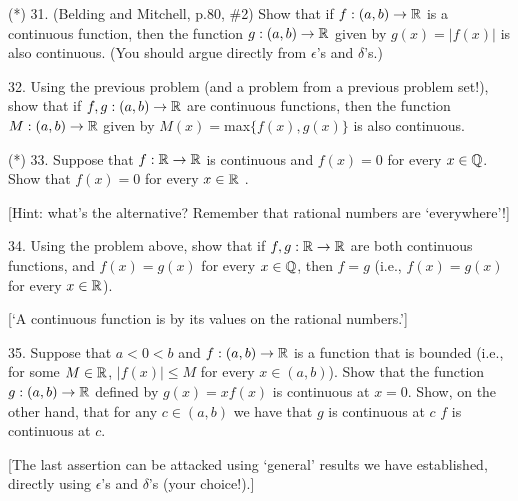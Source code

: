 \documentclass[12pt]{article}
\begin{document}
\begin{description}


\item{(*) 31.} (Belding and Mitchell, p.80, \#2) Show that if $f:(a,b)\rightarrow{\mathbb R}$ is a continuous function, then the function
$g:(a,b)\rightarrow{\mathbb R}$ given by $g(x)=|f(x)|$ is also continuous. (You should argue directly
from $\epsilon$'s and $\delta$'s.)

\msk

\item{32.} Using the previous problem (and a problem from a previous problem set!), show that
if $f,g:(a,b)\rightarrow{\mathbb R}$ are continuous functions, then the function
$M:(a,b)\rightarrow{\mathbb R}$ given by $M(x)=$max$\{f(x),g(x)\}$ is also continuous.

\msk

\item{(*) 33.} Suppose that $f:{\mathbb R}\rightarrow{\mathbb R}$ is continuous and $f(x)=0$ for every $x\in{\mathbb Q}$.
Show that $f(x)=0$ for every $x\in{\mathbb R}$ .

\ssk

\item{\spc} [Hint: what's the alternative? Remember that rational numbers are `everywhere'!]

\msk

\item{34.} Using the problem above, show that if $f,g:{\mathbb R}\rightarrow{\mathbb R}$ are both continuous
functions, and $f(x)=g(x)$ for every $x\in{\mathbb Q}$, then $f=g$ (i.e., $f(x)=g(x)$ for every
$x\in{\mathbb R}$).

\ssk

\item{\spc} [`A continuous function is  by its values on the rational numbers.']


\msk

\item{35.} Suppose that $a<0<b$ and $f:(a,b)\rightarrow{\mathbb R}$ is a function
that is bounded (i.e., for some $M\in{\mathbb R}$, $|f(x)|\leq M$ for every $x\in (a,b)$).
Show that the function $g:(a,b)\rightarrow {\mathbb R}$ defined by $g(x)=xf(x)$ is continuous at $x=0$.
Show, on the other hand, that for any  $c\in(a,b)$ we have that $g$ is continuous
at $c$     $f$ is continuous at $c$.

\ssk

\item{\spc} [The last assertion can be attacked using `general' results we have established,
 directly using $\epsilon$'s and $\delta$'s (your choice!).]


\end{description}
\end{document}
